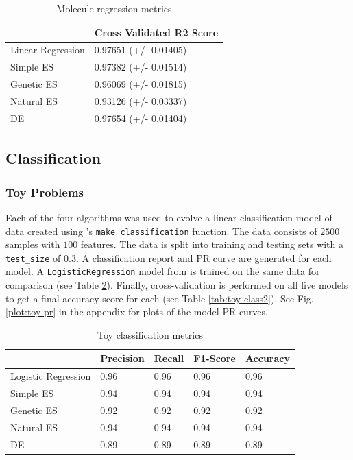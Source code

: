 \documentclass[conference]{IEEEtran}
\begin{document}
\begin{table}[htbp]
\centering
\begin{tabular}{@{}ll@{}}
\toprule
 & Cross Validated R2 Score \\ \midrule
Linear Regression & 0.97651 (+/- 0.01405) \\
Simple ES & 0.97382 (+/- 0.01514) \\
Genetic ES & 0.96069 (+/- 0.01815) \\
Natural ES & 0.93126 (+/- 0.03337) \\
DE & 0.97654 (+/- 0.01404) \\ \bottomrule
\end{tabular}
\caption{Molecule regression metrics}
\label{tab:mol-regr2}
\end{table}

\subsection{Classification}
\subsubsection{Toy Problems}
Each of the four algorithms was used to evolve a linear classification model of data created using \cite{scikit}'s \texttt{make\_classification} function. 
The data consists of $2500$ samples with $100$ features. The data is split into training and testing sets with a \texttt{test\_size} of $0.3$. A 
classification report and PR curve are generated for each model. A \texttt{LogisticRegression} model from \cite{scikit} is trained on the same data 
for comparison (see Table \ref{tab:toy-class1}). Finally, cross-validation is performed on all five models to get a final accuracy score for each 
(see Table \ref{tab:toy-class2}). See Fig. \ref{plot:toy-pr} in the appendix for plots of the model PR curves.

\begin{table}[htbp]
\centering
\begin{tabular}{@{}lllll@{}}
\toprule
 & Precision & Recall & F1-Score & Accuracy \\ \midrule
Logistic Regression & \cellcolor[HTML]{C0C0C0}0.96 & \cellcolor[HTML]{C0C0C0}0.96 & \cellcolor[HTML]{C0C0C0}0.96 & \cellcolor[HTML]{C0C0C0}0.96 \\
Simple ES & 0.94 & 0.94 & 0.94 & 0.94 \\
Genetic ES & 0.92 & 0.92 & 0.92 & 0.92 \\
Natural ES & 0.94 & 0.94 & 0.94 & 0.94 \\
DE & 0.89 & 0.89 & 0.89 & 0.89 \\ \bottomrule
\end{tabular}
\caption{Toy classification metrics}
\label{tab:toy-class1}
\end{table}
\end{document}
